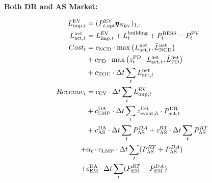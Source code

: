 \documentclass[conference]{IEEEtran}
\begin{document}
\noindent \textbf{Both DR and AS Market:}


\begin{align}
%
    L_{\text{imp},t}^{\text{EV}} &= (P^{\rm EV}_{t,\text{opt}} \pmb{\eta}_{N_{\text{EV}}} \label{eq:load_ev_imp_eta})_{1,:} \\
    L^{\text{net}}_{\text{act},t} &= L_{\text{imp},t}^{\text{EV}} + L_{t}^{\text{building}} + P^{\text{BESS}}_t - P^{\text{PV}}_t \label{eq:actual_net_load} \\
%
    Cost_t &= c_{\text{NCD}} \cdot \max \left(L^{\text{net}}_{\text{act},t}, \bar{L}^{\text{net}}_{\text{NCD}} \right) \label{eq:ncd} \\\nonumber
    &+ c_{\text{PD}} \cdot \max \left(z^{\text{PD}}_t \cdot L^{\text{net}}_{\text{act},t}, \bar{L}^{\text{net}}_{\text{PD}} \right) \\\nonumber
    &+ c_{\text{TOU}} \cdot \Delta t \sum_t L^{\text{net}}_{\text{act},t} \label{eq:tou} \\
%
    Revenue_t &= c_{\text{EV}} \cdot \Delta t \sum_t L^{\text{EV}}_{\text{imp},t} \nonumber \\
    &+ c_{\text{LMP}}^{\text{DA}} \cdot \Delta t \sum_t z_{\text{event},h}^{\text{DR}} \cdot P_{\text{act},t}^{\text{DR}} \\ \nonumber
    &+ c_{\text{AS}}^{\text{DA}} \cdot \Delta t \sum_t P^{DA}_{\rm AS}+c_{\text{AS}}^{\text{RT}} \cdot \Delta t \sum_t P^{RT}_{\rm AS}\\ \nonumber
    + &\alpha_t \cdot c_{\text{LMP}} \cdot \Delta t \sum_t (P^{RT}_{\rm AS}+P^{DA}_{\rm AS})\\ \nonumber
    +&c^{\rm DA}_{\text{EM}} \cdot \Delta t \sum_t (P^{RT}_{\rm EM}+P^{DA}_{\rm EM})\\
%    
\end{align}






\end{document}
